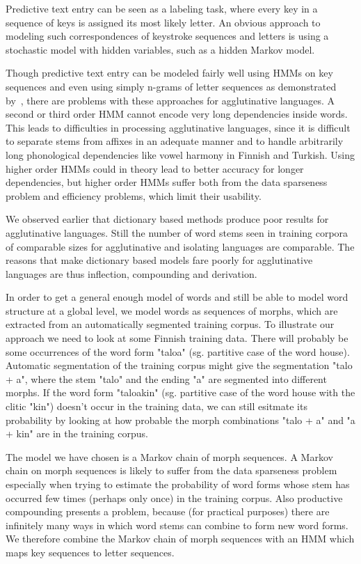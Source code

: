 \documentclass{llncs}
\begin{document}
Predictive text entry can be seen as a labeling task, where every key
in a sequence of keys is assigned its most likely letter. An obvious
approach to modeling such correspondences of keystroke sequences and
letters is using a stochastic model with hidden variables, such as a
hidden Markov model.

Though predictive text entry can be modeled fairly well using HMMs on
key sequences and even using simply n-grams of letter sequences as
demonstrated by~\cite{Tantug:2010}, there are problems with these
approaches for agglutinative languages. A second or third order HMM
cannot encode very long dependencies inside words. This leads to
difficulties in processing agglutinative languages, since it is
difficult to separate stems from affixes in an adequate manner and to
handle arbitrarily long phonological dependencies like vowel harmony
in Finnish and Turkish. Using higher order HMMs could in theory lead
to better accuracy for longer dependencies, but higher order HMMs
suffer both from the data sparseness problem and efficiency problems,
which limit their usability.

We observed earlier that dictionary based methods produce poor results
for agglutinative languages. Still the number of word stems seen in
training corpora of comparable sizes for agglutinative and isolating
languages are comparable. The reasons that make dictionary based
models fare poorly for agglutinative languages are thus inflection,
compounding and derivation. 

In order to get a general enough model of words and still be able to
model word structure at a global level, we model words as sequences of
morphs, which are extracted from an automatically segmented training
corpus. To illustrate our approach we need to look at some Finnish
training data. There will probably be some occurrences of the word
form "taloa" (sg. partitive case of the word house). Automatic
segmentation of the training corpus might give the segmentation "talo
+ a", where the stem "talo" and the ending "a" are segmented into
different morphs. If the word form "taloakin" (sg. partitive case of
the word house with the clitic "kin") doesn't occur in the training
data, we can still esitmate its probability by looking at how probable
the morph combinations "talo + a" and "a + kin" are in the training
corpus.

The model we have chosen is a Markov chain of morph sequences. A
Markov chain on morph sequences is likely to suffer from the data
sparseness problem especially when trying to estimate the probability
of word forms whose stem has occurred few times (perhaps only once) in
the training corpus. Also productive compounding presents a problem,
because (for practical purposes) there are infinitely many ways in
which word stems can combine to form new word forms. We therefore
combine the Markov chain of morph sequences with an HMM which maps key
sequences to letter sequences.
\end{document}
